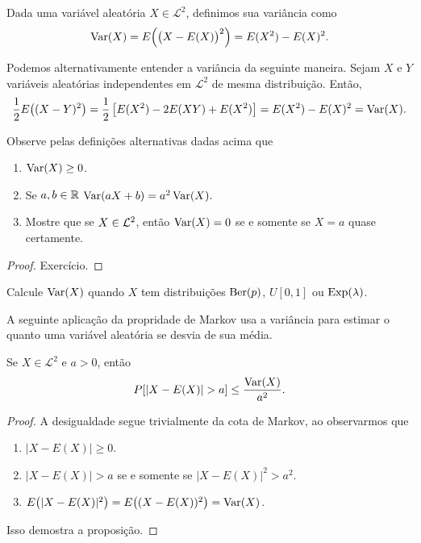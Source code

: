 \begin{definition}
  Dada uma variável aleatória $X \in \mathcal{L}^2$, definimos sua variância  como
  \begin{equation}
    \operatorname{Var}(X) = E \Big( \big(X - E(X)\big)^2 \Big) = E(X^2) - E(X)^2.
  \end{equation}
\end{definition}


Podemos alternativamente entender a variância da seguinte maneira.
Sejam $X$ e $Y$ variáveis aleatórias independentes em $\mathcal{L}^2$ de mesma distribuição.
Então,
\begin{equation}
  \frac{1}{2} E\big( (X - Y)^2 \big) = \frac{1}{2}\left[  E(X^2) - 2 E(XY) + E(X^2)\right] = E(X^2) - E(X)^2 = \operatorname{Var}(X).
\end{equation}


\begin{proposition}
Observe pelas definições alternativas dadas acima que
\begin{enumerate}[\quad a)]
\item $\operatorname{Var}(X) \geq 0$.
\item Se $a, b\in {\ensuremath{\mathbb R}}$ $\operatorname{Var} (aX+b)=a^2 \operatorname{Var}(X).$
\item Mostre que se $X \in {\ensuremath{\mathcal L}}^2$, então $\operatorname{Var}(X) = 0$ se e somente se $X = a$ quase certamente.
\end{enumerate}
\end{proposition}

\begin{proof}
 Exercício.
\end{proof}


\begin{exercise}
  Calcule $\operatorname{Var}(X)$ quando $X$ tem distribuições $\operatorname{Ber}(p)$, $U[0,1]$ ou $\operatorname{Exp}(\lambda)$.
\end{exercise}

A seguinte aplicação da propridade de Markov usa a variância para  estimar o quanto uma variável aleatória se desvia de sua média.
\begin{proposition}
  Se $X \in \mathcal{L}^2$ e $a > 0$, então
  \begin{equation}
    P [ |X - E(X)| > a] \leq \frac{\operatorname{Var}(X)}{a^2}.
  \end{equation}
\end{proposition}

\begin{proof}
  A desigualdade segue trivialmente da cota de Markov, ao observarmos que
  \begin{enumerate}[\quad a)]
  \item $|X - E(X)| \geq 0$.
  \item $|X - E(X)| > a$ se e somente se $|X - E(X)|^2 > a^2$.
  \item $E\big(|X - E(X)|^2\big) = E\big((X - E(X))^2\big) = \operatorname{Var}(X)$.
  \end{enumerate}
  Isso demostra a proposição.
\end{proof}

